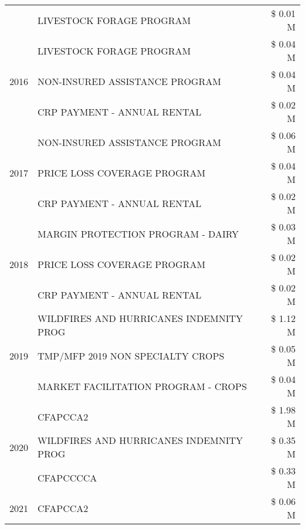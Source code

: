 \begin{tabular}{llr}
 & LIVESTOCK FORAGE PROGRAM & \$ 0.01 M \\
\cline{1-3}
\multirow[t]{3}{*}{2016} & LIVESTOCK FORAGE PROGRAM & \$ 0.04 M \\
 & NON-INSURED ASSISTANCE PROGRAM & \$ 0.04 M \\
 & CRP PAYMENT - ANNUAL RENTAL & \$ 0.02 M \\
\cline{1-3}
\multirow[t]{3}{*}{2017} & NON-INSURED ASSISTANCE PROGRAM & \$ 0.06 M \\
 & PRICE LOSS COVERAGE PROGRAM & \$ 0.04 M \\
 & CRP PAYMENT - ANNUAL RENTAL & \$ 0.02 M \\
\cline{1-3}
\multirow[t]{3}{*}{2018} & MARGIN PROTECTION PROGRAM - DAIRY & \$ 0.03 M \\
 & PRICE LOSS COVERAGE PROGRAM & \$ 0.02 M \\
 & CRP PAYMENT - ANNUAL RENTAL & \$ 0.02 M \\
\cline{1-3}
\multirow[t]{3}{*}{2019} & WILDFIRES AND HURRICANES INDEMNITY PROG & \$ 1.12 M \\
 & TMP/MFP 2019 NON SPECIALTY CROPS & \$ 0.05 M \\
 & MARKET FACILITATION PROGRAM - CROPS & \$ 0.04 M \\
\cline{1-3}
\multirow[t]{3}{*}{2020} & CFAPCCA2 & \$ 1.98 M \\
 & WILDFIRES AND HURRICANES INDEMNITY PROG & \$ 0.35 M \\
 & CFAPCCCCA & \$ 0.33 M \\
\cline{1-3}
2021 & CFAPCCA2 & \$ 0.06 M \\
\cline{1-3}
\bottomrule
\end{tabular}
